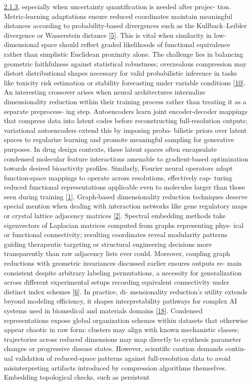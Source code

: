 \documentclass[
]{article}
\begin{document}
\hyperref[probabilistic-and-statistical-spaces]{2.1.3}, especially when
uncertainty quantification is needed after projec- tion. Metric-learning
adaptations ensure reduced coordinates maintain meaningful distances
according to probability-based divergences such as the Kullback--Leibler
divergence or Wasserstein distance {[}\hyperref[_bookmark45]{5}{]}. This
is vital when similarity in low-dimensional space should reflect graded
likelihoods of functional equivalence rather than simplistic Euclidean
proximity alone. The challenge lies in balancing geometric faithfulness
against statistical robustness; overzealous compression may distort
distributional shapes necessary for valid probabilistic inference in
tasks like toxicity risk estimation or stability forecasting under
variable conditions {[}\hyperref[_bookmark50]{10}{]}. An interesting
crossover arises when neural architectures internalize dimensionality
reduction within their training process rather than treating it as a
separate preprocess- ing step. Autoencoders learn joint encoder-decoder
mappings that compress data into latent codes before reconstructing
full-resolution outputs; variational autoencoders extend this by
imposing proba- bilistic priors over latent spaces to regularize
learning and promote meaningful sampling for generative purposes. In
drug design contexts, these latent spaces often encapsulate condensed
molecular feature interactions amenable to gradient-based optimization
towards desired bioactivity profiles. Similarly, Fourier neural
operators adapt function-space mappings to operate across resolutions,
effectively cap- turing reduced functional representations applicable
even to molecules larger than those seen during training
{[}\hyperref[_bookmark41]{1}{]}. Graph-based dimensionality reduction
techniques deserve special mention when dealing with interaction
networks like gene regulatory maps or crystal lattice adjacency matrices
{[}\hyperref[_bookmark42]{2}{]}. Spectral embedding methods take
eigenvectors of Laplacian matrices computed from graphs representing
phys- ical or functional connectivity; resulting coordinates reveal
modularity patterns guiding therapeutic targeting or structural
engineering decisions more transparently than raw adjacency lists ever
could. Moreover, coupling graph reductions with geometric invariances
discussed earlier ensures outputs re- main consistent despite arbitrary
labeling permutations, a necessity for generalization across different
experimental setups recording equivalent connectivity under distinct
index schemes {[}\hyperref[_bookmark46]{6}{]}. In practice, di-
mensionality reduction's utility extends beyond modeling efficiency, it
shapes interpretability pathways for complex AI systems used in
biomedical and materials domains {[}\hyperref[_bookmark58]{18}{]}.
Condensed representations expose global organization schemes within
datasets that otherwise appear chaotic in raw form: clusters may align
with known mechanistic classes; trajectories across reduced dimensions
may map directly to synthesis parameter changes or progressive disease
states. However, scientific caution demands contin- ual validation of
reduced-space patterns against full-resolution data to avoid
misinterpreting artifacts introduced by compression algorithms
themselves. Embedding topological checks, such as persistent
\end{document}
